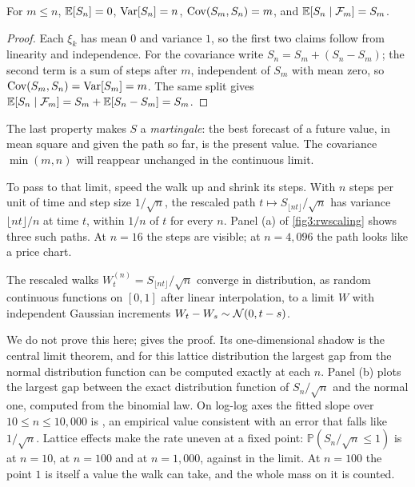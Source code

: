 \begin{chapterrefs}
\begin{proposition}\label{prop3:srw}
For $m\le n$, $\mathbb{E}[S_n]=0$, $\operatorname{Var}[S_n]=n$, $\operatorname{Cov}(S_m,S_n)=m$, and $\mathbb{E}[S_n\mid\mathcal F_m]=S_m$.
\end{proposition}

\begin{proof}
Each $\xi_k$ has mean $0$ and variance $1$, so the first two claims follow from linearity and
independence. For the covariance write $S_n = S_m + (S_n-S_m)$; the second term is a sum of steps after
$m$, independent of $S_m$ with mean zero, so $\operatorname{Cov}(S_m,S_n)=\operatorname{Var}[S_m]=m$. The same split gives
$\mathbb{E}[S_n\mid\mathcal F_m] = S_m + \mathbb{E}[S_n-S_m] = S_m$.
\end{proof}

The last property makes $S$ a \emph{martingale}: the best forecast of a future value, in mean square and given the path so far, is the present
value. The covariance $\min(m,n)$ will reappear unchanged in the continuous limit.

To pass to that limit, speed the walk up and shrink its steps. With $n$ steps per unit of time and step
size $1/\sqrt n$, the rescaled path $t\mapsto S_{\lfloor nt\rfloor}/\sqrt n$ has variance $\lfloor nt\rfloor/n$ at time $t$, within
$1/n$ of $t$ for every $n$. Panel (a) of \cref{fig3:rwscaling} shows three such paths. At $n=16$ the
steps are visible; at $n=4{,}096$ the path looks like a price chart.

\begin{theorem}[Donsker]\label{thm3:donsker}
The rescaled walks $W^{(n)}_t = S_{\lfloor nt\rfloor}/\sqrt n$ converge in distribution, as random
continuous functions on $[0,1]$ after linear interpolation, to a limit $W$ with independent Gaussian
increments $W_t-W_s\sim\mathcal{N}(0,t-s)$.
\end{theorem}

We do not prove this here; \textcite{billingsley1999} gives the proof. Its one-dimensional shadow is the central limit theorem, and for this lattice distribution the largest gap from the normal distribution function can be
computed exactly at each $n$. Panel (b)
plots the largest gap between the exact distribution function of $S_n/\sqrt n$ and the normal one,
computed from the binomial law. On log-log axes the fitted slope over $10\le n\le10{,}000$ is \rwKolSlope, an empirical value consistent
with an error that falls like $1/\sqrt n$. Lattice effects make the rate uneven at a fixed point: $\mathbb P(S_n/\sqrt n\le 1)$ is
\rwCdfTen{} at $n=10$, \rwCdfHundred{} at $n=100$ and \rwCdfThousand{} at $n=1{,}000$, against
\normCdfOne{} in the limit. At $n=100$ the point $1$ is itself a value the walk can take, and the whole
mass on it is counted.


\end{chapterrefs}
